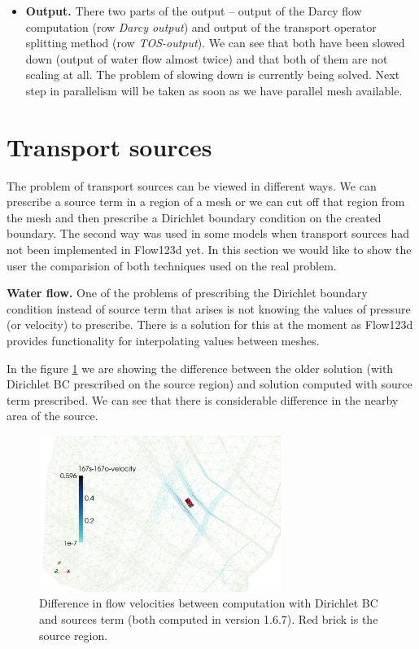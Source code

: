 \begin{itemize}
\item \textbf{Output.} There two parts of the output -- output of the Darcy flow computation (row \emph{Darcy output}) and 
output of the transport operator splitting method (row \emph{TOS-output}). We can see that both have been slowed down 
(output of water flow almost twice) and that both of them are not scaling at all. The problem of
slowing down is currently being solved. Next step in parallelism will be taken as soon as we have parallel mesh available.

\end{itemize}

\pagebreak





\section{Transport sources}
The problem of transport sources can be viewed in different ways. We can prescribe a source term in a region of a mesh 
or we can cut off that region from the mesh and then prescribe a Dirichlet boundary condition on the created boundary. 
The second way was used in some models when transport sources had not been implemented in Flow123d yet.
In this section we would like to show the user the comparision of both techniques used on the real problem.

\textbf{Water flow.} One of the problems of prescribing the Dirichlet boundary condition instead of source term that arises
is not knowing the values of pressure (or velocity) to prescribe. There is a solution for this at the moment as Flow123d provides
functionality for interpolating values between meshes. 

In the figure \ref{fig:bench_mel1} we are showing the difference between the older solution (with Dirichlet BC prescribed on the source region) and 
solution computed with source term prescribed. We can see that there is considerable difference in the nearby area of the source.

\begin{figure}
        \centering
        \includegraphics[width=0.7\textwidth]{tests_graphics/mel_167s-167_velocity.pdf}
        \caption{Difference in flow velocities between computation with Dirichlet BC and sources term (both computed in version 1.6.7). 
                 Red brick is the source region.}
        \label{fig:bench_mel1}
\end{figure}

